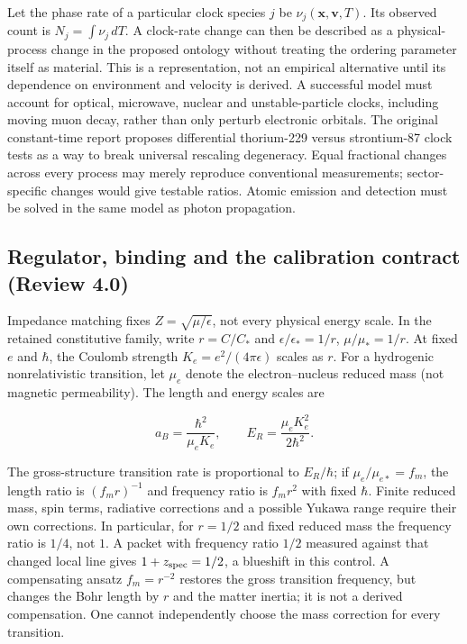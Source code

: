\documentclass[
  11pt,
  twoside]{article}
\begin{document}
Let the phase rate of a particular clock species \(j\) be
\(\nu_j(\mathbf{x},\mathbf{v},T)\). Its observed count is
\(N_j=\int\nu_j\,dT\). A clock-rate change can then be described as a
physical-process change in the proposed ontology without treating the
ordering parameter itself as material. This is a representation, not an
empirical alternative until its dependence on environment and velocity
is derived. A successful model must account for optical, microwave,
nuclear and unstable-particle clocks, including moving muon decay,
rather than only perturb electronic orbitals. The original constant-time
report proposes differential thorium-229 versus strontium-87 clock tests
as a way to break universal rescaling degeneracy. Equal fractional
changes across every process may merely reproduce conventional
measurements; sector-specific changes would give testable ratios. Atomic
emission and detection must be solved in the same model as photon
propagation.

\subsection{Regulator, binding and the calibration contract (Review
4.0)}\label{regulator-binding-and-the-calibration-contract-review-4.0}

Impedance matching fixes \(Z=\sqrt{\mu/\epsilon}\), not every physical
energy scale. In the retained constitutive family, write \(r=C/C_*\) and
\(\epsilon/\epsilon_*=1/r\), \(\mu/\mu_*=1/r\). At fixed \(e\) and
\(\hbar\), the Coulomb strength \(K_e=e^2/(4\pi\epsilon)\) scales as
\(r\). For a hydrogenic nonrelativistic transition, let \(\mu_e\) denote
the electron--nucleus reduced mass (not magnetic permeability). The
length and energy scales are

\[a_B=\frac{\hbar^2}{\mu_e K_e},\qquad E_R=\frac{\mu_e K_e^2}{2\hbar^2}.\tag{C1}\]

The gross-structure transition rate is proportional to \(E_R/\hbar\); if
\(\mu_e/\mu_{e*}=f_m\), the length ratio is \((f_m r)^{-1}\) and
frequency ratio is \(f_m r^2\) with fixed \(\hbar\). Finite reduced
mass, spin terms, radiative corrections and a possible Yukawa range
require their own corrections. In particular, for \(r=1/2\) and fixed
reduced mass the frequency ratio is \(1/4\), not \(1\). A packet with
frequency ratio \(1/2\) measured against that changed local line gives
\(1+z_{\rm spec}=1/2\), a blueshift in this control. A compensating
ansatz \(f_m=r^{-2}\) restores the gross transition frequency, but
changes the Bohr length by \(r\) and the matter inertia; it is not a
derived compensation. One cannot independently choose the mass
correction for every transition.
\end{document}
